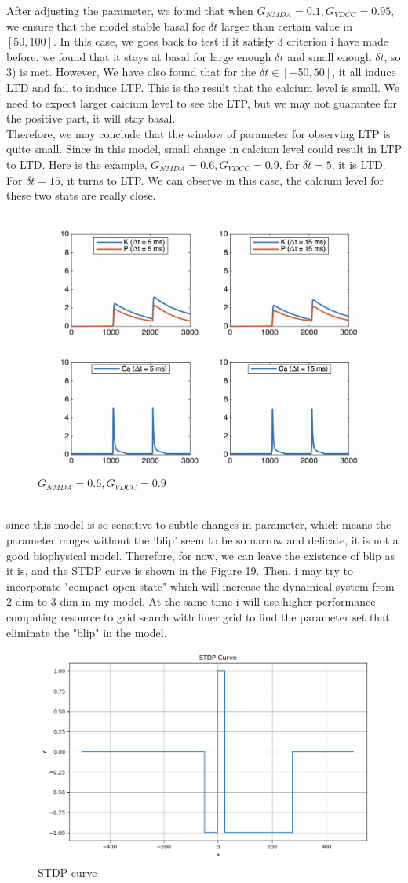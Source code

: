 \documentclass{article}
\begin{document}
After adjusting the parameter, we found that when $G_{NMDA}=0.1,G_{VDCC}=0.95$, we ensure that the model stable basal for $\delta t$ larger than certain value in $[50,100]$. In this case, we goes back to test if it satisfy 3 criterion i have made before. we found that it stays at basal for large enough $\delta t$ and small enough $\delta t$, so 3) is met. However, We have also found that for the $\delta t\in [-50,50]$, it all induce LTD and fail to induce LTP. This is the result that the calcium level is small. We need to expect larger caicium level to see the LTP, but we may not guarantee for the positive part, it will stay basal.\\ Therefore, we may conclude that the window of parameter for observing LTP is quite small. Since in this model, small change in calcium level could result in LTP to LTD. Here is the example, $G_{NMDA}=0.6,G_{VDCC}=0.9$, for $\delta t=5$, it is LTD. For $\delta t=15$, it turns to LTP. We can observe in this case, the calcium level for these two stats are really close.
\begin{figure}[ht]
    \centering
    \includegraphics[width=.6\linewidth]{0.6.png}
    \caption{$G_{NMDA}=0.6,G_{VDCC}=0.9$}
    \label{fig:fig4}
\end{figure}\\
since this model is so sensitive to subtle changes in parameter, which means the parameter ranges without the 'blip' seem to be so narrow and delicate, it is not a good biophysical model. Therefore, for now, we can leave the existence of blip as it is, and the STDP curve is shown in the Figure 19. Then, i may try to incorporate "compact open state" which will increase the dynamical system from 2 dim to 3 dim in my model. At the same time i will use higher performance computing resource to grid search with finer grid to find the parameter set that eliminate the "blip" in the model.
\begin{figure}[ht]
    \centering
    \includegraphics[width=.5\linewidth]{STDP.png}
    \caption{STDP curve}
    \label{fig:fig4}
\end{figure}\\
\end{document}
